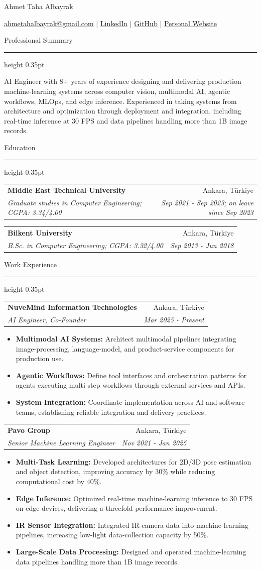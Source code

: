 \documentclass[10pt,a4paper]{article}
\makeatletter
\newcommand{\cvsection}[1]{%
  \vspace{0.62em}%
  {\sectionfont\fontsize{13.2}{15}\selectfont #1}\par
  \vspace{0.10em}\hrule height 0.35pt
  \vspace{0.42em}%
}
\newcommand{\educationentry}[4]{%
  \begin{tabularx}{\textwidth}{@{}Xr@{}}
    \textbf{#1} & #3 \\
    \textit{#2} & \textit{#4}
  \end{tabularx}
  \vspace{0.42em}%
}
\newcommand{\experienceentry}[5]{%
  \begin{tabularx}{\textwidth}{@{}Xr@{}}
    \textbf{#1} & #3 \\
    \textit{#2} & \textit{#4}
  \end{tabularx}
  \vspace{-0.30em}
  \begin{itemize}[leftmargin=1.50em,label=\textbullet,itemsep=0.08em,topsep=0.18em,parsep=0pt,partopsep=0pt]
    #5
  \end{itemize}
  \vspace{0.08em}%
}
\makeatother
\begin{document}
\fontsize{9.35}{10.85}\selectfont

\begin{center}
  {\fontsize{27}{31}\selectfont Ahmet Taha Albayrak}\par
  \vspace{0.22em}
  \href{mailto:ahmetahalbayrak@gmail.com}{ahmetahalbayrak@gmail.com}
  \enspace|\enspace
  \href{https://www.linkedin.com/in/atalbayrak}{LinkedIn}
  \enspace|\enspace
  \href{https://github.com/atalbayrak}{GitHub}
  \enspace|\enspace
  \href{https://atalbayrak.github.io/}{Personal Website}
\end{center}

\cvsection{Professional Summary}
AI Engineer with 8+ years of experience designing and delivering production machine-learning systems across computer vision, multimodal AI, agentic workflows, MLOps, and edge inference. Experienced in taking systems from architecture and optimization through deployment and integration, including real-time inference at 30 FPS and data pipelines handling more than 1B image records.

\cvsection{Education}
\educationentry
  {Middle East Technical University}
  {Graduate studies in Computer Engineering; CGPA: 3.34/4.00}
  {Ankara, Türkiye}
  {Sep 2021 - Sep 2023; on leave since Sep 2023}
\educationentry
  {Bilkent University}
  {B.Sc. in Computer Engineering; CGPA: 3.32/4.00}
  {Ankara, Türkiye}
  {Sep 2013 - Jun 2018}

\cvsection{Work Experience}
\experienceentry
  {NuveMind Information Technologies}
  {AI Engineer, Co-Founder}
  {Ankara, Türkiye}
  {Mar 2025 - Present}
  {
    \item \textbf{Multimodal AI Systems:} Architect multimodal pipelines integrating image-processing, language-model, and product-service components for production use.
    \item \textbf{Agentic Workflows:} Define tool interfaces and orchestration patterns for agents executing multi-step workflows through external services and APIs.
    \item \textbf{System Integration:} Coordinate implementation across AI and software teams, establishing reliable integration and delivery practices.
  }

\experienceentry
  {Pavo Group}
  {Senior Machine Learning Engineer}
  {Ankara, Türkiye}
  {Nov 2021 - Jan 2025}
  {
    \item \textbf{Multi-Task Learning:} Developed architectures for 2D/3D pose estimation and object detection, improving accuracy by 30\% while reducing computational cost by 40\%.
    \item \textbf{Edge Inference:} Optimized real-time machine-learning inference to 30 FPS on edge devices, delivering a threefold performance improvement.
    \item \textbf{IR Sensor Integration:} Integrated IR-camera data into machine-learning pipelines, increasing low-light data-collection capacity by 50\%.
    \item \textbf{Large-Scale Data Processing:} Designed and operated machine-learning data pipelines handling more than 1B image records.
  }
\end{document}
